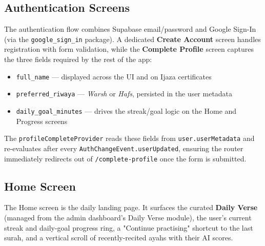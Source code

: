 
\subsection{Authentication Screens}

The authentication flow combines Supabase email/password and Google Sign-In (via the \texttt{google\_sign\_in} package). A dedicated \textbf{Create Account} screen handles registration with form validation, while the \textbf{Complete Profile} screen captures the three fields required by the rest of the app:

\begin{itemize}[leftmargin=2em]
  \item \texttt{full\_name} --- displayed across the UI and on Ijaza certificates
  \item \texttt{preferred\_riwaya} --- \emph{Warsh} or \emph{Hafs}, persisted in the user metadata
  \item \texttt{daily\_goal\_minutes} --- drives the streak/goal logic on the Home and Progress screens
\end{itemize}

The \texttt{profileCompleteProvider} reads these fields from \texttt{user.userMetadata} and re-evaluates after every \texttt{AuthChangeEvent.userUpdated}, ensuring the router immediately redirects out of \texttt{/complete-profile} once the form is submitted.




\subsection{Home Screen}

The Home screen is the daily landing page. It surfaces the curated \textbf{Daily Verse} (managed from the admin dashboard's Daily Verse module), the user's current streak and daily-goal progress ring, a "Continue practising" shortcut to the last surah, and a vertical scroll of recently-recited ayahs with their AI scores.

